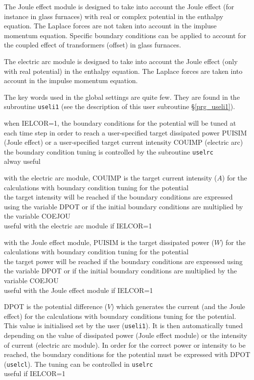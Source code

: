 The Joule effect module is designed to take into account the Joule effect
(for instance in glass furnaces) with real or complex potential in the
enthalpy equation. The Laplace forces are not taken into account in the
impluse momentum equation. Specific boundary conditions can be applied to
account for the coupled effect of transformers (offset) in glass furnaces.

The electric arc module is designed to take into account the Joule effect
(only with real potential) in the enthalpy equation. The Laplace forces
are taken into account in the impulse momentum equation.

The key words used in the global settings are quite few. They are
found in the subroutine \texttt{useli1} (see the description of this
user subroutine \S\ref{prg_useli1}).

{when IELCOR=1, the boundary conditions for the potential will be tuned at each
time step in order to reach a user-specified target dissipated power PUISIM
(Joule effect) or a user-specified target current intensity COUIMP (electric
arc)\\
the boundary condition tuning is controlled by the subroutine \texttt{uselrc}\\
alway useful}

{with the electric arc module, COUIMP is the target current intensity ($A$)
for the calculations with boundary condition tuning for the potential\\
the target intensity will be reached if the boundary conditions are expressed
using the variable DPOT or if the initial boundary conditions are multiplied by
the variable COEJOU\\
useful with the electric arc module if IELCOR=1}

{with the Joule effect module, PUISIM is the target dissipated power ($W$)
for the calculations with boundary condition tuning for the potential\\
the target power will be reached if the boundary conditions are expressed
using the variable DPOT or if the initial boundary conditions are multiplied by
the variable COEJOU\\
useful with the Joule effect module if IELCOR=1}

{DPOT is the potential difference ($V$) which generates the current (and the Joule effect) for the 
calculations with boundary conditions tuning for the potential. This value is
initialised set by the user (\texttt{useli1}). It is then automatically tuned
depending on the value of dissipated power (Joule effect module) or the
intensity of current (electric arc module).
In order for the correct power or intensity to be reached, the boundary
conditions for the potential must be expressed with DPOT (\texttt{uselcl}). The
tuning can be controlled in \texttt{uselrc}\\
useful if IELCOR=1}

